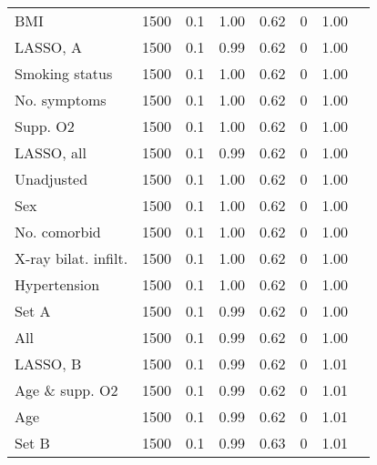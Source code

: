 \documentclass{article}
\begin{document}
{\begin{longtable}{lccccccc}
BMI & 1500 & 0.1 & 1.00 & 0.62 & 0 & 1.00\\
LASSO, A & 1500 & 0.1 & 0.99 & 0.62 & 0 & 1.00\\
Smoking status & 1500 & 0.1 & 1.00 & 0.62 & 0 & 1.00\\
No. symptoms & 1500 & 0.1 & 1.00 & 0.62 & 0 & 1.00\\
Supp. O2 & 1500 & 0.1 & 1.00 & 0.62 & 0 & 1.00\\
LASSO, all & 1500 & 0.1 & 0.99 & 0.62 & 0 & 1.00\\
Unadjusted & 1500 & 0.1 & 1.00 & 0.62 & 0 & 1.00\\
Sex & 1500 & 0.1 & 1.00 & 0.62 & 0 & 1.00\\
No. comorbid & 1500 & 0.1 & 1.00 & 0.62 & 0 & 1.00\\
X-ray bilat. infilt. & 1500 & 0.1 & 1.00 & 0.62 & 0 & 1.00\\
Hypertension & 1500 & 0.1 & 1.00 & 0.62 & 0 & 1.00\\
Set A & 1500 & 0.1 & 0.99 & 0.62 & 0 & 1.00\\
All & 1500 & 0.1 & 0.99 & 0.62 & 0 & 1.00\\
LASSO, B & 1500 & 0.1 & 0.99 & 0.62 & 0 & 1.01\\
Age \& supp. O2 & 1500 & 0.1 & 0.99 & 0.62 & 0 & 1.01\\
Age & 1500 & 0.1 & 0.99 & 0.62 & 0 & 1.01\\
Set B & 1500 & 0.1 & 0.99 & 0.63 & 0 & 1.01\\
\bottomrule
\hline
\end{longtable}
}

\clearpage
\end{document}
